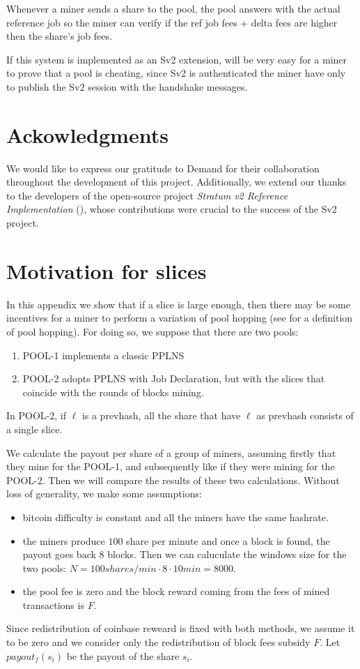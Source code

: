 \documentclass[11pt]{article}
\begin{document}
Whenever a miner sends a share to the pool, the pool answers with the actual reference job so the miner can verify if the ref job fees + delta fees are higher then the share's job fees.

If this system is implemented as an Sv2 extension, will be very easy for a miner to prove that a pool is cheating, since Sv2 is authenticated the miner have only to publish the Sv2 session with the handshake messages.

\section{Ackowledgments}
We would like to express our gratitude to Demand \cite{demand} for their collaboration throughout the development of this project. Additionally, we extend our thanks to the developers of the open-source project \emph{Stratum v2 Reference Implementation} (\cite{sv2}), whose contributions were crucial to the success of the Sv2 project.


\appendix
\section{Motivation for slices}
In this appendix we show that if a slice is large enough, then there may be some incentives for a miner to perform a variation of pool hopping (see \cite{rosenfeld} for a definition of pool hopping). For doing so, we suppose that there are two pools:
\begin{enumerate}
	\item POOL-1 implements a classic PPLNS
	\item POOL-2 adopts PPLNS with Job Declaration, but with the slices that coincide with the rounds of blocks mining. 
\end{enumerate}
In POOL-2, if $\ell$ is a prevhash, all the share that have $\ell$ as prevhash consists of a single slice.

We calculate the payout per share of a group of miners, assuming firstly that they mine for the POOL-1, and subsequently like if they were mining for the POOL-2. Then we will compare the results of these two calculations. Without loss of generality, we make some assumptions:
\begin{itemize}
	\item bitcoin difficulty is constant and all the miners have the same hashrate.
	\item the miners produce $100$ share per minute and once a block is found, the payout goes back $8$ blocks. Then we can caluculate the windows size for the two pools: $N = 100 shares/min \cdot 8 \cdot 10min = 8000$.
	\item the pool fee is zero and the block reward coming from the fees of mined transactions is $F$. 
	
\end{itemize}
Since redistribution of coinbase reweard is fixed with both methods, we assume it to be zero and we consider only the redistribution of block fees subsidy $F$.
Let $payout_f(s_i)$ be the payout of the share $s_i$.
\end{document}
